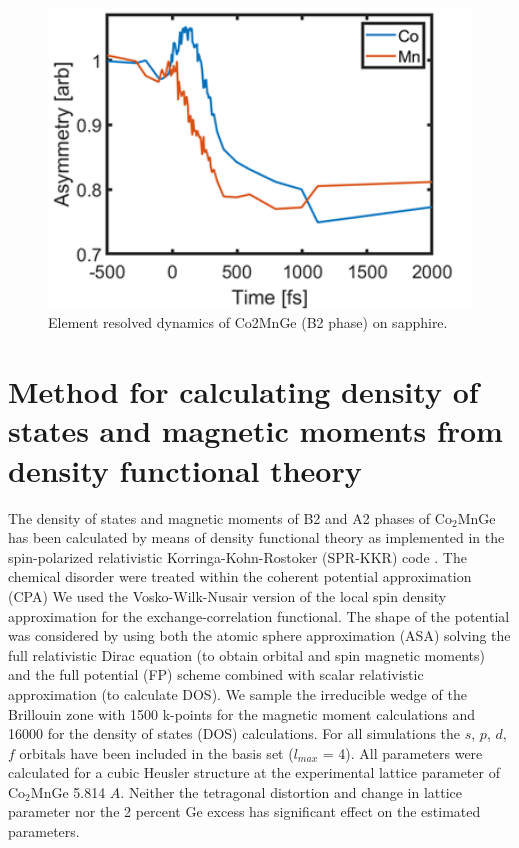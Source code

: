 \begin{figure}[htbp]
	\begin{center}
		\includegraphics[width=120mm]{figs/SapphireHeusler}
	\end{center}
	\caption{Element resolved dynamics of Co2MnGe (B2 phase) on sapphire.}
	\label{fig: SapphireHeusler}
\end{figure}

\section{Method for calculating density of states and magnetic moments from density functional theory}
The density of states and magnetic moments of B2 and A2 phases of Co$_2$MnGe has been calculated by means of density functional theory \cite{Hohenberg1964,KOHN1965}  as implemented in the spin-polarized relativistic Korringa-Kohn-Rostoker (SPR-KKR) code \cite{Kruglyak2010}. The chemical disorder were treated within the coherent potential approximation (CPA) \cite{Ebert2011,Soven1967} We used the Vosko-Wilk-Nusair \cite{Stocks1978} version of the local spin density approximation for the exchange-correlation functional. The shape of the potential was considered by using both the atomic sphere approximation (ASA) solving the full relativistic Dirac equation (to obtain orbital and spin magnetic moments) and the full potential (FP) scheme combined with scalar relativistic approximation (to calculate DOS). We sample the irreducible wedge of the Brillouin zone with 1500 k-points for the magnetic moment calculations and 16000 for the density of states (DOS) calculations. For all simulations the $s$, $p$, $d$, $f$ orbitals have been included in the basis set ($l_{max}$ = 4). All parameters were calculated for a cubic Heusler structure at the experimental lattice parameter of Co$_2$MnGe 5.814 $A$. Neither the tetragonal distortion and change in lattice parameter nor the 2 percent Ge excess has significant effect on the estimated parameters.

